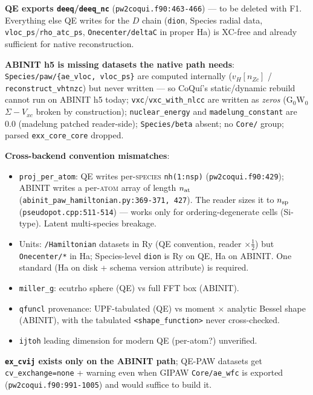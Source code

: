 \documentclass[11pt]{article}
\newcommand{\code}[1]{\texttt{\small #1}}
\newcommand{\file}[1]{\texttt{\small #1}}
\begin{document}
\begin{description}[leftmargin=2.6em,style=nextline]
\item[F8.] \textbf{QE exports \code{deeq}/\code{deeq\_nc}}
(\file{pw2coqui.f90:463-466}) --- to be deleted with F1. Everything else QE
writes for the $D$ chain (\code{dion}, Species radial data,
\code{vloc\_ps}/\code{rho\_atc\_ps}, \code{Onecenter/deltaC} in proper Ha)
is XC-free and already sufficient for native reconstruction.

\item[F9.] \textbf{ABINIT h5 is missing datasets the native path needs}:
\code{Species/paw/\{ae\_vloc, vloc\_ps\}} are computed internally
($v_H[n_{Zc}]$ / \code{reconstruct\_vhtnzc}) but never written --- so
CoQu\'i's static/dynamic rebuild cannot run on ABINIT h5 today;
\code{vxc}/\code{vxc\_with\_nlcc} are written as \emph{zeros} (G$_0$W$_0$
$\Sigma - V_{xc}$ broken by construction); \code{nuclear\_energy} and
\code{madelung\_constant} are $0.0$ (madelung patched reader-side);
\code{Species/beta} absent; no \code{Core/} group; parsed
\code{exx\_core\_core} dropped.

\item[F10.] \textbf{Cross-backend convention mismatches}:
\begin{itemize}[leftmargin=1.4em]
\item \code{proj\_per\_atom}: QE writes per-\textsc{species}
\code{nh(1:nsp)} (\file{pw2coqui.f90:429}); ABINIT writes a per-\textsc{atom}
array of length $n_{\rm at}$
(\file{abinit\_paw\_hamiltonian.py:369-371, 427}). The reader sizes it to
$n_{\rm sp}$ (\code{pseudopot.cpp:511-514}) --- works only for
ordering-degenerate cells (Si-type). Latent multi-species breakage.
\item Units: \code{/Hamiltonian} datasets in Ry (QE convention, reader
$\times\tfrac12$) but \code{Onecenter/*} in Ha; Species-level \code{dion} is
Ry on QE, Ha on ABINIT. One standard (Ha on disk + schema version attribute)
is required.
\item \code{miller\_g}: ecutrho sphere (QE) vs full FFT box (ABINIT).
\item \code{qfuncl} provenance: UPF-tabulated (QE) vs moment $\times$
analytic Bessel shape (ABINIT), with the tabulated
\code{<shape\_function>} never cross-checked.
\item \code{ijtoh} leading dimension for modern QE (per-atom?) unverified.
\end{itemize}

\item[F11.] \textbf{\code{ex\_cvij} exists only on the ABINIT path}; QE-PAW
datasets get \code{cv\_exchange=none} + warning even when GIPAW
\code{Core/ae\_wfc} is exported (\file{pw2coqui.f90:991-1005}) and would
suffice to build it.
\end{description}
\end{document}
